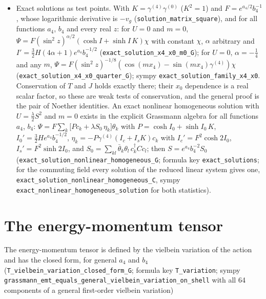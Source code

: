 \documentclass[11pt]{article}
\begin{document}
\begin{itemize}
\item Exact solutions as test points. With $K = \gamma^{(4)}\gamma^{(0)}$ ($K^2 = 1$) and $F = e^{a_4/2}b_4^{-1}$, whose logarithmic derivative is $-v_g$ (\texttt{solution\allowbreak{}\_matrix\_\allowbreak{}square}), and for all functions $a_4$, $b_4$ and every real $z$: for $U = 0$ and $m = 0$, $\Psi = F(\sin^2 z)^{\alpha/2}(\cosh I + \sinh I\,K)\chi$ with constant $\chi$, $\alpha$ arbitrary and $I' = \tfrac32H(4\alpha + 1)e^{a_4}b_4^{-1/2}$ (\texttt{exact\_so\allowbreak{}lution\_x\allowbreak{}4\_x0\_m0\_\allowbreak{}G}); for $U = 0$, $\alpha = -\tfrac14$ and any $m$, $\Psi = F(\sin^2 z)^{-1/8}(\cos(mx_4) - \sin(mx_4)\gamma^{(4)})\chi$ (\texttt{exact\_so\allowbreak{}lution\_x\allowbreak{}4\_x0\_qua\allowbreak{}rter\_G}); sympy \texttt{exact\_so\allowbreak{}lution\_f\allowbreak{}amily\_x4\allowbreak{}\_x0}. Conservation of $T$ and $J$ holds exactly there; their $x_0$ dependence is a real scalar factor, so these are weak tests of conservation, and the general proof is the pair of Noether identities. An exact nonlinear homogeneous solution with $U = \frac{\lambda}{2}S^2$ and $m = 0$ exists in the explicit Grassmann algebra for all functions $a_4$, $b_4$: $\Psi = F\sum_k\big[Pc_k + \lambda S_0\,\eta_k\big]\theta_k$ with $P = \cosh I_0 + \sinh I_0\,K$, $I_0' = \tfrac32He^{a_4}b_4^{-1/2}$, $\eta_k = -P\gamma^{(4)}(I_c + I_sK)c_k$ with $I_c' = F^2\cosh 2I_0$, $I_s' = F^2\sinh 2I_0$, and $S_0 = \sum_{kl}\bar\theta_k\theta_l\,c_k^\dagger Cc_l$; then $S = e^{a_4}b_4^{-2}S_0$ (\texttt{exact\_so\allowbreak{}lution\_n\allowbreak{}onlinear\allowbreak{}\_homogen\allowbreak{}eous\_G}; formula key \texttt{exact\_so\allowbreak{}lutions}; for the commuting field every solution of the reduced linear system gives one, \texttt{exact\_so\allowbreak{}lution\_n\allowbreak{}onlinear\allowbreak{}\_homogen\allowbreak{}eous\_C}, sympy \texttt{exact\_no\allowbreak{}nlinear\_\allowbreak{}homogene\allowbreak{}ous\_solu\allowbreak{}tion} for both statistics).
\end{itemize}

\section{The energy-momentum tensor}

The energy-momentum tensor is defined by the vielbein variation of the action and has the closed form, for general $a_4$ and $b_4$ (\texttt{T\_vielbe\allowbreak{}in\_varia\allowbreak{}tion\_clo\allowbreak{}sed\_form\allowbreak{}\_G}; formula key \texttt{T\_variat\allowbreak{}ion}; sympy \texttt{grassman\allowbreak{}n\_emt\_eq\allowbreak{}uals\_gen\allowbreak{}eral\_vie\allowbreak{}lbein\_va\allowbreak{}riation\_\allowbreak{}on\_shell} with all 64 components of a general first-order vielbein variation)
\end{document}
